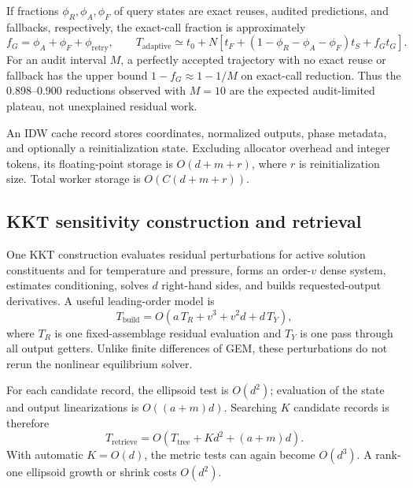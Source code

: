 \documentclass[11pt]{article}
\begin{document}
If fractions \(\phi_R,\phi_A,\phi_F\) of query states are exact reuses, audited predictions, and
fallbacks, respectively, the exact-call fraction is approximately
\begin{equation}
  f_G = \phi_A+\phi_F+\phi_{\mathrm{retry}},
  \qquad
  T_{\mathrm{adaptive}}\simeq t_0+N\left[t_F+
  (1-\phi_R-\phi_A-\phi_F)t_S+f_Gt_G\right].
  \label{eq:adaptive-cost-model}
\end{equation}
For an audit interval \(M\), a perfectly accepted trajectory with no exact reuse or fallback has
the upper bound \(1-f_G\approx1-1/M\) on exact-call reduction.  Thus the 0.898--0.900 reductions
observed with \(M=10\) are the expected audit-limited plateau, not unexplained residual work.

An IDW cache record stores coordinates, normalized outputs, phase metadata, and optionally a
reinitialization state.  Excluding allocator overhead and integer tokens, its floating-point
storage is \(O(d+m+r)\), where \(r\) is reinitialization size.  Total worker storage is
\(O(C(d+m+r))\).

\subsection{KKT sensitivity construction and retrieval}

One KKT construction evaluates residual perturbations for active solution constituents and for
temperature and pressure, forms an order-\(v\) dense system, estimates conditioning, solves \(d\)
right-hand sides, and builds requested-output derivatives.  A useful leading-order model is
\begin{equation}
  T_{\mathrm{build}} =
  O\!\left(a\,T_R+v^3+v^2d+d\,T_Y\right),
\end{equation}
where \(T_R\) is one fixed-assemblage residual evaluation and \(T_Y\) is one pass through all output
getters.  Unlike finite differences of GEM, these perturbations do not rerun the nonlinear
equilibrium solver.

For each candidate record, the ellipsoid test is \(O(d^2)\); evaluation of the state and output
linearizations is \(O((a+m)d)\).  Searching \(K\) candidate records is therefore
\begin{equation}
  T_{\mathrm{retrieve}} =
  O\!\left(T_{\mathrm{tree}}+Kd^2+(a+m)d\right).
\end{equation}
With automatic \(K=O(d)\), the metric tests can again become \(O(d^3)\).  A rank-one ellipsoid
growth or shrink costs \(O(d^2)\).
\end{document}
